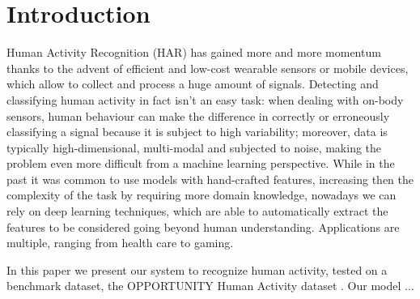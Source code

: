 
\section{Introduction}
\label{sec:introduction}

Human Activity Recognition (HAR) has gained more and more momentum thanks to the advent of efficient and low-cost wearable sensors or mobile devices, which allow to collect and process a huge amount of signals.
Detecting and classifying human activity in fact isn't an easy task: when dealing with on-body sensors, human behaviour can make the difference in correctly or erroneously classifying a signal because it is subject to high variability; moreover, data is typically high-dimensional, multi-modal and subjected to noise, making the problem even more difficult from a machine learning perspective.
While in the past it was common to use models with hand-crafted features, increasing then the complexity of the task by requiring more domain knowledge, nowadays we can rely on deep learning techniques, which are able to automatically extract the features to be considered going beyond human understanding.
Applications are multiple, ranging from health care to gaming.

In this paper we present our system to recognize human activity, tested on a benchmark dataset, the OPPORTUNITY Human Activity dataset \cite{bibid}. Our model ...


\\

